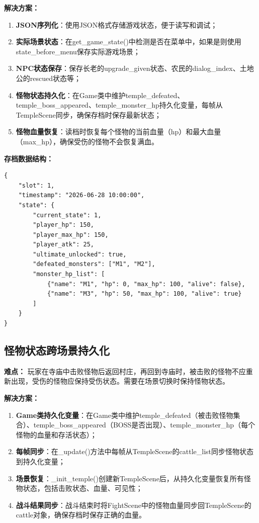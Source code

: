 \documentclass[a4paper,12pt]{article}
\begin{document}
\textbf{解决方案：}
\begin{enumerate}[label=(\arabic*)]
    \item \textbf{JSON序列化}：使用JSON格式存储游戏状态，便于读写和调试；
    \item \textbf{实际场景状态}：在get\_game\_state()中检测是否在菜单中，如果是则使用state\_before\_menu保存实际游戏场景；
    \item \textbf{NPC状态保存}：保存长老的upgrade\_given状态、农民的dialog\_index、土地公的rescued状态等；
    \item \textbf{怪物状态持久化}：在Game类中维护temple\_defeated、temple\_boss\_appeared、temple\_monster\_hp持久化变量，每帧从TempleScene同步，确保存档时保存最新状态；
    \item \textbf{怪物血量恢复}：读档时恢复每个怪物的当前血量（hp）和最大血量（max\_hp），确保受伤的怪物不会恢复满血。
\end{enumerate}

\textbf{存档数据结构：}
\begin{verbatim}
{
    "slot": 1,
    "timestamp": "2026-06-28 10:00:00",
    "state": {
        "current_state": 1,
        "player_hp": 150,
        "player_max_hp": 150,
        "player_atk": 25,
        "ultimate_unlocked": true,
        "defeated_monsters": ["M1", "M2"],
        "monster_hp_list": [
            {"name": "M1", "hp": 0, "max_hp": 100, "alive": false},
            {"name": "M3", "hp": 50, "max_hp": 100, "alive": true}
        ]
    }
}
\end{verbatim}

\subsection{怪物状态跨场景持久化}

\textbf{难点：}
玩家在寺庙中击败怪物后返回村庄，再回到寺庙时，被击败的怪物不应重新出现，受伤的怪物应保持受伤状态。需要在场景切换时保持怪物状态。

\textbf{解决方案：}
\begin{enumerate}[label=(\arabic*)]
    \item \textbf{Game类持久化变量}：在Game类中维护temple\_defeated（被击败怪物集合）、temple\_boss\_appeared（BOSS是否出现）、temple\_monster\_hp（每个怪物的血量和存活状态）；
    \item \textbf{每帧同步}：在\_update()方法中每帧从TempleScene的cattle\_list同步怪物状态到持久化变量；
    \item \textbf{场景恢复}：\_init\_temple()创建新TempleScene后，从持久化变量恢复所有怪物状态，包括击败状态、血量、可见性；
    \item \textbf{战斗结果同步}：战斗结束时将FightScene中的怪物血量同步回TempleScene的cattle对象，确保存档时保存正确的血量。
\end{enumerate}
\end{document}
